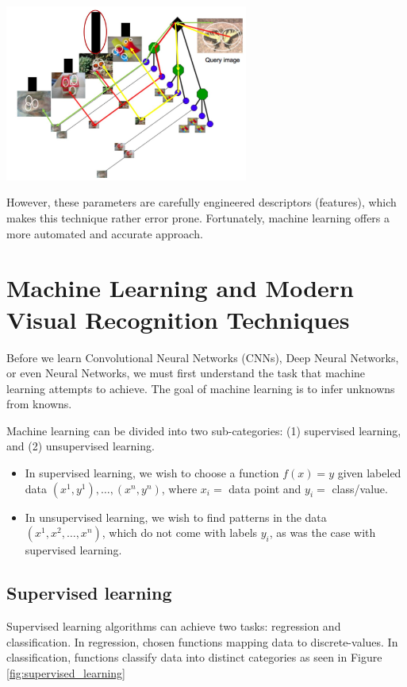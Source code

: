 \documentclass[twoside]{article}
\begin{document}
\begin{center}
	\includegraphics[width=0.6\textwidth]{bag_of_words}
\end{center}

However, these parameters are carefully engineered descriptors (features), which makes this technique rather error prone. Fortunately, machine learning offers a more automated and accurate approach.

\section{Machine Learning and Modern Visual Recognition Techniques}

Before we learn Convolutional Neural Networks (CNNs), Deep Neural Networks, or even Neural Networks, we must first understand the task that machine learning attempts to achieve. The goal of machine learning is to infer unknowns from knowns.

Machine learning can be divided into two sub-categories: (1) supervised learning, and (2) unsupervised learning.

\begin{itemize}
\item In supervised learning, we wish to choose a function $f(x) = y$ given labeled data $(x^1, y^1), \dots, (x^n, y^n)$, where $x_i =$ data point and $y_i =$ class/value.

\item In unsupervised learning, we wish to find patterns in the data $(x^1, x^2, \dots, x^n)$, which do not come with labels $y_i$, as was the case with supervised learning.
\end{itemize}

\subsection{Supervised learning}

Supervised learning algorithms can achieve two tasks: regression and classification. In regression, chosen functions mapping data to discrete-values. In classification, functions classify data into distinct categories as seen in Figure \ref{fig:supervised_learning}
\end{document}
